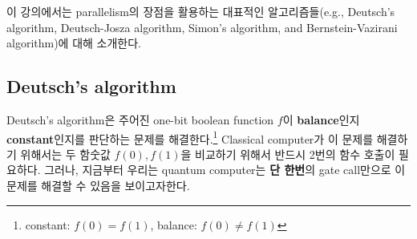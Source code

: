 이 강의에서는 parallelism의 장점을 활용하는 대표적인 알고리즘들(e.g., Deutsch’s algorithm, Deutsch-Josza algorithm, Simon’s algorithm, and Bernstein-Vazirani algorithm)에 대해 소개한다.

\subsection{Deutsch’s algorithm}
Deutsch’s algorithm은 주어진 one-bit boolean function $f$이 \textbf{balance}인지 \textbf{constant}인지를 판단하는 문제를 해결한다.\footnote{constant: $f(0)=f(1)$, balance: $f(0)\ne f(1)$}
Classical computer가 이 문제를 해결하기 위해서는 두 함숫값 $f(0), f(1)$을 비교하기 위해서 반드시 2번의 함수 호출이 필요하다.
그러나, 지금부터 우리는 quantum computer는 \textbf{단 한번}의 gate call만으로 이 문제를 해결할 수 있음을 보이고자한다.

